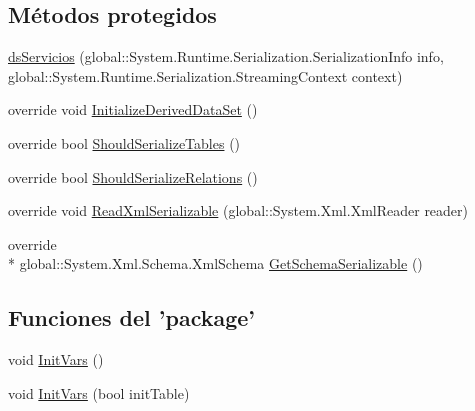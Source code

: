 \subsection*{Métodos protegidos}
\begin{DoxyCompactItemize}
\item 
\hyperlink{class_proyecto___integrador__3_1_1ds_servicios_a9c16aad1d299f9a0f4e8206476970c80}{ds\-Servicios} (global\-::\-System.\-Runtime.\-Serialization.\-Serialization\-Info info, global\-::\-System.\-Runtime.\-Serialization.\-Streaming\-Context context)
\item 
override void \hyperlink{class_proyecto___integrador__3_1_1ds_servicios_a0fdfd68e26fcf989dc0baaddaeb65cd6}{Initialize\-Derived\-Data\-Set} ()
\item 
override bool \hyperlink{class_proyecto___integrador__3_1_1ds_servicios_a5c968fc20f7357c59446a2359f6dff7d}{Should\-Serialize\-Tables} ()
\item 
override bool \hyperlink{class_proyecto___integrador__3_1_1ds_servicios_acb67b4c55e4372ca6319f5639640bf6e}{Should\-Serialize\-Relations} ()
\item 
override void \hyperlink{class_proyecto___integrador__3_1_1ds_servicios_ad7fe046c07204e180948c180786a41f5}{Read\-Xml\-Serializable} (global\-::\-System.\-Xml.\-Xml\-Reader reader)
\item 
override \\*
global\-::\-System.\-Xml.\-Schema.\-Xml\-Schema \hyperlink{class_proyecto___integrador__3_1_1ds_servicios_a6ae2de80ca82f7e90ee19212c90cc127}{Get\-Schema\-Serializable} ()
\end{DoxyCompactItemize}
\subsection*{Funciones del 'package'}
\begin{DoxyCompactItemize}
\item 
void \hyperlink{class_proyecto___integrador__3_1_1ds_servicios_a58f88c51e90b3494390aa1cd37635db0}{Init\-Vars} ()
\item 
void \hyperlink{class_proyecto___integrador__3_1_1ds_servicios_a1637aa2b1c235c969ae3fec848a75e2e}{Init\-Vars} (bool init\-Table)
\end{DoxyCompactItemize}
